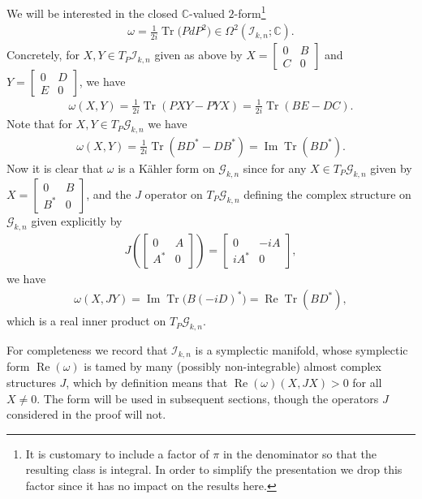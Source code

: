 \documentclass[11pt]{article}
\DeclareMathOperator{\Tr}{Tr}
\numberwithin{equation}{section}
\newcommand{\CC}{\mathbb{C}}
\newcommand{\cG}{{\mathcal G}}
\newcommand{\cI}{{\mathcal I}}
\newcommand{\Om}{\Omega}
\begin{document}
We will be interested in the closed $\CC$-valued $2$-form\footnote{It is customary to include a factor of $\pi$ in the denominator so that the resulting class is integral. In order to simplify the presentation we drop this factor since it has no impact on the results here.}
\begin{gather*}
\omega = \frac {1}{2i} \Tr\big(P dP^2\big) \in \Om^2 ( \cI_{k,n} ; \CC).
\end{gather*}
Concretely, for $X,Y \in T_P \cI_{k,n}$ given as above by
$X =\left[
\begin{smallmatrix}
0 & B \\
C & 0
\end{smallmatrix}\right]$ and
$Y =\left[
\begin{smallmatrix}
0 & D \\
E & 0
\end{smallmatrix}\right]$, we have
\begin{gather*}
\omega(X,Y) = \frac {1}{2i} \Tr(PXY - PYX) = \frac {1}{2i} \Tr (BE - DC) .
\end{gather*}
Note that for $X,Y \in T_P \cG_{k,n}$ we have
\begin{gather*}
\omega(X,Y) = \frac {1}{2i} \Tr(BD^* - DB^*) = \operatorname{Im} \Tr(BD^*).
\end{gather*}
Now it is clear that $\omega$ is a K\"ahler form on $ \cG_{k,n}$ since for any $X \in T_P \cG_{k,n}$ given by
$X =\left[
\begin{smallmatrix}
0 & B \\
B^* & 0
\end{smallmatrix}\right]$, and the $J$ operator on $T_P \cG_{k,n}$ defining the complex structure on $\cG_{k,n}$ given explicitly by
\begin{gather*}
J\left(
\begin{bmatrix}
0 & A \\
A^* & 0
\end{bmatrix}
\right)
=
\begin{bmatrix}
0 & -iA \\
iA^* & 0
\end{bmatrix},
\end{gather*}
we have
\begin{gather*}
\omega(X,JY) = \operatorname{Im} \Tr \big(B (-iD)^*\big) = \operatorname{Re} \Tr(B D^*),
\end{gather*}
which is a real inner product on $T_P \cG_{k,n}$.

For completeness we record that $\cI_{k,n}$ is a symplectic manifold, whose symplectic form $\operatorname{Re}(\omega)$ is tamed by many (possibly non-integrable) almost complex structures $J$, which by definition means that $\operatorname{Re}(\omega)(X,JX) >0$ for all $X\neq 0$. The form will be used in subsequent sections, though the operators $J$ considered in the proof will not.
\end{document}
